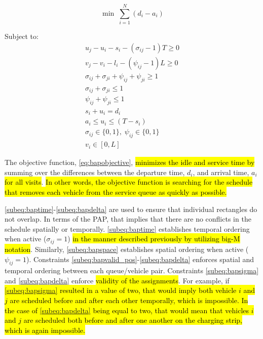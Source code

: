 \documentclass[utf8]{FrontiersinHarvard}
\begin{document}
\begin{equation}
	\label{eq:bapobjective}
	\min\; \sum_{i=1}^N (d_i - a_i)
\end{equation}

Subject to:
\begin{subequations}
\label{eq:bapconstrs}
\begin{align}
    u_j - u_i - s_i - (\sigma_{ij} - 1)T \geq 0   \label{subeq:baptime}          \\
    v_j - v_i - l_i - (\psi_{ij} - 1)L \geq 0   \label{subeq:bapspace}           \\
    \sigma_{ij} + \sigma_{ji} + \psi_{ij} + \psi_{ji} \geq 1 \label{subeq:bapvalid_pos}     \\
    \sigma_{ij} + \sigma_{ji} \leq 1                   \label{subeq:bapsigma}        \\
    \psi_{ij} + \psi_{ji} \leq 1                   \label{subeq:bapdelta}        \\
    s_i + u_i = d_i                       \label{subeq:bapdetach}       \\
    a_i \leq u_i \leq (T - s_i)                 \label{subeq:bapvalid_starts} \\
    \sigma_{ij} \in \{0,1\},\;\psi_{ij} \in \{0,1\}\; \label{subeq:bapsdspace}      \\
    v_i \in [0, L ]                         \label{subeq:bapvspace}
\end{align}
\end{subequations}

\noindent The objective function, \autoref{eq:bapobjective}, \hl{minimizes the idle and service time by}
summing over the differences between the departure time, \(d_i\), and arrival time, \(a_i\) \hl{for all visits}.
\hl{In other words, the objective function is searching for the schedule that removes each vehicle from the service queue as quickly as possible.}

\autoref{subeq:baptime}-\autoref{subeq:bapdelta} are used to ensure that individual rectangles do not overlap. In terms
of the PAP, that implies that there are no conflicts in the schedule spatially or temporally. \autoref{subeq:baptime}
establishes temporal ordering when active (\(\sigma_{ij}=1\)) \hl{in the manner described previously by utilizing big-M notation}. Similarly, \autoref{subeq:bapspace} establishes spatial ordering when active (\(\psi_{ij} =1\)).
Constraints \autoref{subeq:bapvalid_pos}-\autoref{subeq:bapdelta} enforces spatial and temporal ordering between each
queue/vehicle pair. Constraints \autoref{subeq:bapsigma} and \autoref{subeq:bapdelta} enforce \hl{validity of the assignments}. For example, if \hl{{\autoref{subeq:bapsigma}} resulted in a value of two, that would imply both vehicle $i$ and $j$ are scheduled before and after each other temporally, which is impossible. In the case of {\autoref{subeq:bapdelta}} being equal to two, that would mean that vehicles $i$ and $j$ are scheduled both before and after one another on the charging strip, which is again impossible.}
\end{document}
